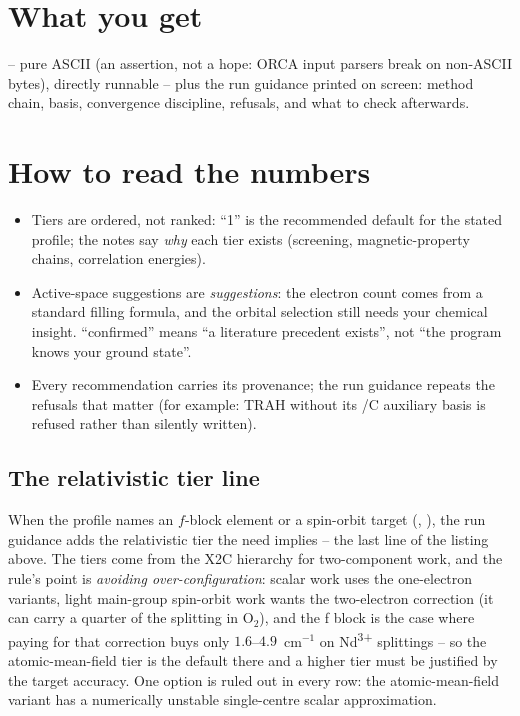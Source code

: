 \section{What you get}

 -- pure ASCII (an assertion, not a hope: ORCA input
parsers break on non-ASCII bytes), directly runnable -- plus the run guidance
printed on screen: method chain, basis, convergence discipline, refusals, and
what to check afterwards.

\section{How to read the numbers}

\begin{readbox}
\begin{itemize}
  \item Tiers are ordered, not ranked: ``1'' is the recommended default for
    the stated profile; the notes say \emph{why} each tier exists (screening,
    magnetic-property chains, correlation energies).
  \item Active-space suggestions are \emph{suggestions}: the electron count
    comes from a standard filling formula, and the orbital selection still
    needs your chemical insight. ``confirmed'' means ``a literature precedent
    exists'', not ``the program knows your ground state''.
  \item Every recommendation carries its provenance; the run guidance repeats
    the refusals that matter (for example: TRAH without its /C auxiliary basis
    is refused rather than silently written).
\end{itemize}
\end{readbox}

\subsection{The relativistic tier line}

When the profile names an $f$-block element or a spin-orbit target
(, ), the run guidance adds the relativistic tier
the need implies -- the last line of the listing above.  The tiers come from the
X2C hierarchy for two-component work, and the rule's point is \emph{avoiding
over-configuration}: scalar work uses the one-electron variants, light
main-group spin-orbit work wants the two-electron correction (it can carry a
quarter of the splitting in O$_2$), and the f block is the case where paying for
that correction buys only $1.6$--$4.9$~cm$^{-1}$ on Nd\textsuperscript{3+}
splittings -- so the atomic-mean-field tier is the default there and a higher
tier must be justified by the target accuracy.  One option is ruled out in
every row: the atomic-mean-field variant  has a numerically
unstable single-centre scalar approximation.

